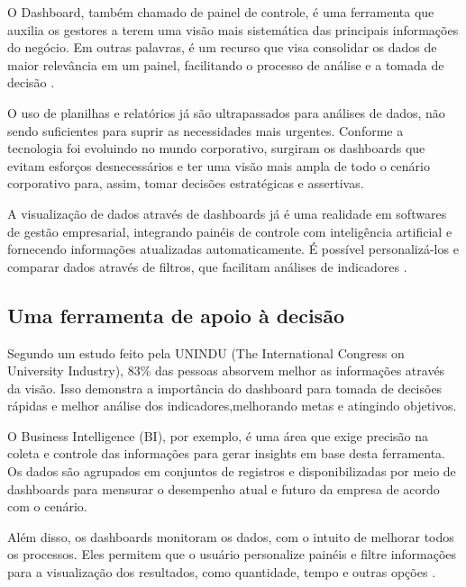 \indent
\par O Dashboard, também chamado de painel de controle, é uma ferramenta que auxilia os gestores a terem uma visão mais sistemática das principais informações do negócio. Em outras palavras, é um recurso que visa consolidar os dados de maior relevância em um painel, facilitando o processo de análise e a tomada de decisão \cite{Intelipost}.

\par O uso de planilhas e relatórios já são ultrapassados para análises de dados, não sendo suficientes para suprir as necessidades mais urgentes. Conforme a tecnologia foi evoluindo no mundo corporativo, surgiram os dashboards que evitam esforços desnecessários e ter uma visão mais ampla de todo o cenário corporativo para, assim, tomar decisões estratégicas e assertivas.

\par A visualização de dados através de dashboards já é uma realidade em softwares de gestão empresarial, integrando painéis de controle com inteligência artificial e fornecendo informações atualizadas automaticamente. É possível personalizá-los e comparar dados através de filtros, que facilitam análises de indicadores \cite{Tecnicon}.


\subsection{Uma ferramenta de apoio à decisão}

\indent
\par Segundo um estudo feito pela UNINDU (The International Congress on University Industry), 83\% das pessoas absorvem melhor as informações através da visão. Isso demonstra a importância do dashboard para tomada de decisões rápidas e melhor análise dos indicadores,melhorando metas e atingindo objetivos.

\par O Business Intelligence (BI), por exemplo, é uma área que exige precisão na coleta e controle das informações para gerar insights em base desta ferramenta. Os dados são agrupados em conjuntos de registros e disponibilizadas por meio de dashboards para mensurar o desempenho atual e futuro da empresa de acordo com o cenário.

\par Além disso, os dashboards monitoram os dados, com o intuito de melhorar todos os processos. Eles permitem que o usuário personalize painéis e filtre informações para a visualização dos resultados, como quantidade, tempo e outras opções \cite{Tecnicon}.

